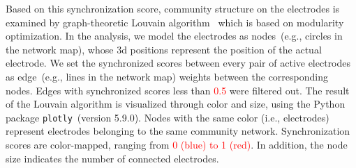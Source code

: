 \documentclass[11pt]{article}
\begin{document}
Based on this synchronization score,  community structure on the electrodes is examined by graph-theoretic Louvain algorithm~\citep{PhysRevE.69.026113, blondel_fast_2008} which is based on modularity optimization.
In the analysis, we model the electrodes as nodes~(e.g., circles in the network map), whose 3d positions represent the position of the actual electrode. 
We set the synchronized scores between every pair of active electrodes as edge~(e.g., lines in the network map) weights between the corresponding nodes.
Edges with synchronized scores less than \textcolor{red}{0.5} were filtered out.
The result of the Louvain algorithm is visualized through color and size, using the Python package \texttt{plotly}~(version  5.9.0).
Nodes with the same color (i.e., electrodes) represent electrodes belonging to the same community network.
Synchronization scores are color-mapped, ranging from \textcolor{red}{0 (blue) to 1 (red)}.
In addition, the node size indicates the number of connected electrodes.




\end{document}
